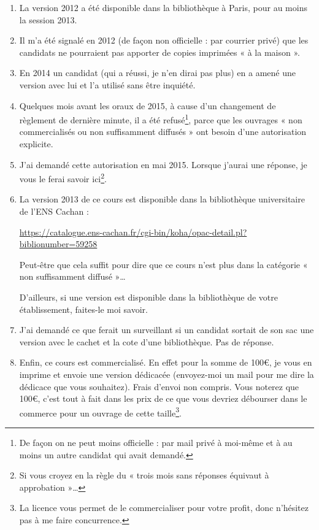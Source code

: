\begin{enumerate}
    \item
        La version 2012 a été disponible dans la bibliothèque à Paris, pour au moins la session 2013.
    \item 
        Il m'a été signalé en 2012 (de façon non officielle : par courrier privé) que les candidats ne pourraient pas apporter de copies imprimées « à la maison ».
    \item
        En 2014 un candidat (qui a réussi, je n'en dirai pas plus) en a amené une version avec lui et l'a utilisé sans être inquiété.
    \item
        Quelques mois avant les oraux de 2015, à cause d'un changement de règlement de dernière minute, il a été refusé\footnote{De façon on ne peut moins officielle : par mail privé à moi-même et à au moins un autre candidat qui avait demandé.}, parce que les ouvrages « non commercialisés ou non suffisamment diffusés » ont besoin d'une autorisation explicite.
    \item
        J'ai demandé cette autorisation en mai 2015. Lorsque j'aurai une réponse, je vous le ferai savoir ici\footnote{Si vous croyez en la règle du « trois mois sans réponses équivaut à approbation »\ldots}.
    \item
        La version 2013 de ce cours est disponible dans la bibliothèque universitaire de l'ENS Cachan :
        \begin{center}
            \url{https://catalogue.ens-cachan.fr/cgi-bin/koha/opac-detail.pl?biblionumber=59258}
        \end{center}
        Peut-être que cela suffit pour dire que ce cours n'est plus dans la catégorie « non suffisamment diffusé »\ldots

        D'ailleurs, si une version est disponible dans la bibliothèque de votre établissement, faites-le moi savoir.
    \item
        J'ai demandé ce que ferait un surveillant si un candidat sortait de son sac une version avec le cachet et la cote d'une bibliothèque. Pas de réponse.
    \item
        Enfin, ce cours est commercialisé. En effet pour la somme de 100€, je vous en imprime et envoie une version dédicacée (envoyez-moi un mail pour me dire la dédicace que vous souhaitez). Frais d'envoi non compris. Vous noterez que 100€, c'est tout à fait dans les prix de ce que vous devriez débourser dans le commerce pour un ouvrage de cette taille\footnote{La licence vous permet de le commercialiser pour votre profit, donc n'hésitez pas à me faire concurrence.}.
\end{enumerate}

